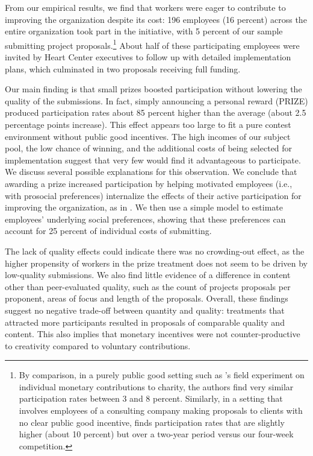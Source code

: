 \documentclass[11pt, titlepage]{article}
\begin{document}
From our empirical results, we find that workers were eager to
contribute to improving the organization despite its cost: 196 employees
(16 percent) across the entire organization took part in the initiative,
with 5 percent of our sample submitting project proposals.\footnote{By
  comparison, in a purely public good setting such as
  \citet{list2002effects}'s field experiment on individual monetary
  contributions to charity, the authors find very similar participation
  rates between 3 and 8 percent. Similarly, in a setting that involves
  employees of a consulting company making proposals to clients with no
  clear public good incentive, \citet{gibbs2014field} finds
  participation rates that are slightly higher (about 10 percent) but
  over a two-year period versus our four-week competition.} About half
of these participating employees were invited by Heart Center executives
to follow up with detailed implementation plans, which culminated in two
proposals receiving full funding.

Our main finding is that small prizes boosted participation without
lowering the quality of the submissions. In fact, simply announcing a
personal reward (PRIZE) produced participation rates about 85 percent
higher than the average (about 2.5 percentage points increase). This
effect appears too large to fit a pure contest environment without
public good incentives. The high incomes of our subject pool, the low
chance of winning, and the additional costs of being selected for
implementation suggest that very few would find it advantageous to
participate. We discuss several possible explanations for this
observation. We conclude that awarding a prize increased participation
by helping motivated employees (i.e., with prosocial preferences)
internalize the effects of their active participation for improving the
organization, as in \citet{morgan2000financing}. We then use a simple
model to estimate employees' underlying social preferences, showing that
these preferences can account for 25 percent of individual costs of
submitting.

The lack of quality effects could indicate there was no crowding-out
effect, as the higher propensity of workers in the prize treatment does
not seem to be driven by low-quality submissions. We also find little
evidence of a difference in content other than peer-evaluated quality,
such as the count of projects proposals per proponent, areas of focus
and length of the proposals. Overall, these findings suggest no negative
trade-off between quantity and quality: treatments that attracted more
participants resulted in proposals of comparable quality and content.
This also implies that monetary incentives were not counter-productive
to creativity compared to voluntary contributions.
\end{document}

